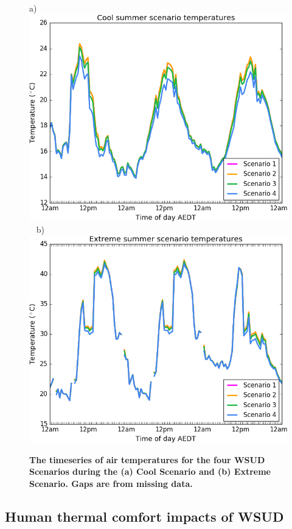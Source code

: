 \documentclass[final,3p,times,authoryear]{elsarticle}
\begin{document}
\begin{figure}[!htbp]
\centering   
a)\includegraphics[scale=0.40]{images/fig3a}
~
b)\includegraphics[scale=0.40]{images/fig3b} 
\caption{\bf The timeseries of air temperatures for the four WSUD Scenarios during the (a) Cool Scenario and (b) Extreme Scenario. Gaps are from missing data.}    
 \label{fig:timeseries_scenarios} 
\end{figure} 




\subsection{Human thermal comfort impacts of WSUD}\label{sec:results_htc}
\end{document}

